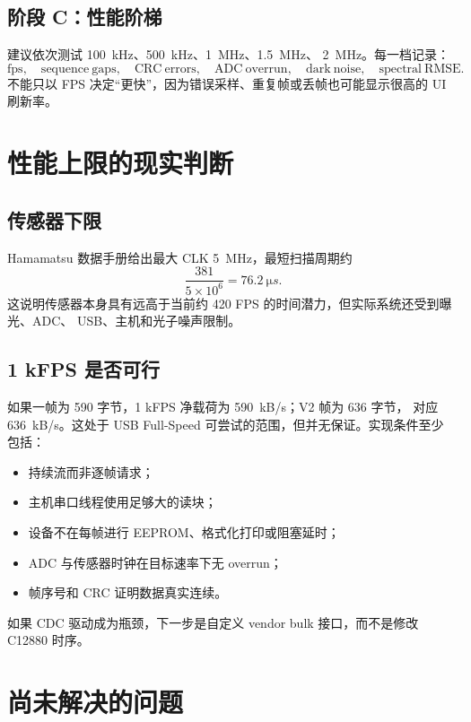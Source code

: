 \documentclass[UTF8,fontset=windows,11pt]{ctexart}
\begin{document}
\subsection{阶段 C：性能阶梯}

建议依次测试 \SI{100}{kHz}、\SI{500}{kHz}、\SI{1}{MHz}、\SI{1.5}{MHz}、
\SI{2}{MHz}。每一档记录：
\[
\mathrm{fps},\quad
\mathrm{sequence\ gaps},\quad
\mathrm{CRC\ errors},\quad
\mathrm{ADC\ overrun},\quad
\mathrm{dark\ noise},\quad
\mathrm{spectral\ RMSE}.
\]
不能只以 FPS 决定“更快”，因为错误采样、重复帧或丢帧也可能显示很高的 UI 刷新率。

\section{性能上限的现实判断}

\subsection{传感器下限}

Hamamatsu 数据手册给出最大 CLK \SI{5}{MHz}，最短扫描周期约
\[
\frac{381}{5\times10^6}=\SI{76.2}{\micro s}.
\]
这说明传感器本身具有远高于当前约 420 FPS 的时间潜力，但实际系统还受到曝光、ADC、
USB、主机和光子噪声限制。

\subsection{1 kFPS 是否可行}

如果一帧为 590 字节，1 kFPS 净载荷为 \SI{590}{kB/s}；V2 帧为 636 字节，
对应 \SI{636}{kB/s}。这处于 USB Full-Speed 可尝试的范围，但并无保证。实现条件至少
包括：
\begin{itemize}
  \item 持续流而非逐帧请求；
  \item 主机串口线程使用足够大的读块；
  \item 设备不在每帧进行 EEPROM、格式化打印或阻塞延时；
  \item ADC 与传感器时钟在目标速率下无 overrun；
  \item 帧序号和 CRC 证明数据真实连续。
\end{itemize}
如果 CDC 驱动成为瓶颈，下一步是自定义 vendor bulk 接口，而不是修改 C12880 时序。

\section{尚未解决的问题}
\end{document}
